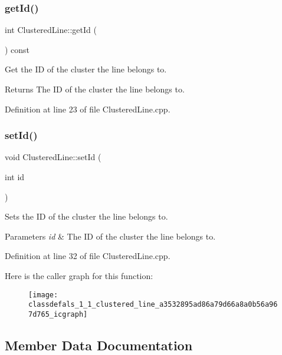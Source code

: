 \subsubsection{\texorpdfstring{get\+Id()}{getId()}}
{\footnotesize\ttfamily int Clustered\+Line\+::get\+Id (\begin{DoxyParamCaption}{ }\end{DoxyParamCaption}) const}

Get the ID of the cluster the line belongs to.

\begin{DoxyReturn}{Returns}
The ID of the cluster the line belongs to. 
\end{DoxyReturn}


Definition at line 23 of file Clustered\+Line.\+cpp.

\mbox{\label{classdefals_1_1_clustered_line_a3532895ad86a79d66a8a0b56a967d765}} 
\subsubsection{\texorpdfstring{set\+Id()}{setId()}}
{\footnotesize\ttfamily void Clustered\+Line\+::set\+Id (\begin{DoxyParamCaption}\item[{int}]{id }\end{DoxyParamCaption})}

Sets the ID of the cluster the line belongs to.


\begin{DoxyParams}{Parameters}
{\em id} & The ID of the cluster the line belongs to. \\
\hline
\end{DoxyParams}


Definition at line 32 of file Clustered\+Line.\+cpp.

Here is the caller graph for this function\+:\nopagebreak
\begin{figure}[H]
\begin{center}
\leavevmode
\texttt{[image: classdefals\_1\_1\_clustered\_line\_a3532895ad86a79d66a8a0b56a967d765\_icgraph]}
\end{center}
\end{figure}


\subsection{Member Data Documentation}
\mbox{\label{classdefals_1_1_clustered_line_a63572edec61c742881722ceccc3bee7c}} 
